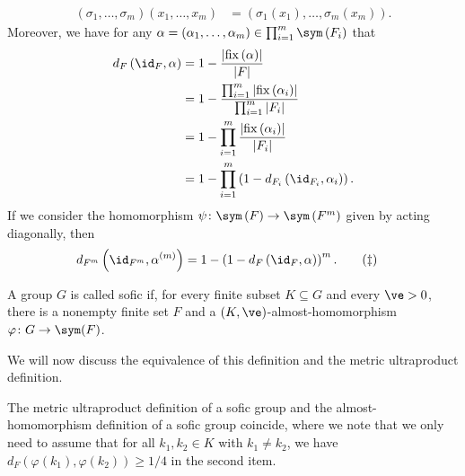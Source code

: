 \documentclass[10pt]{mypackage}
\begin{document}
\begin{align*}
  \left( \sigma_1,\dots,\sigma_m \right)\left( x_1,\dots,x_m \right) &= \left( \sigma_1\left(x_1\right),\dots,\sigma_m\left( x_m \right) \right).
\end{align*}
Moreover, we have for any $\alpha = \left( \alpha_1,\dots,\alpha_m \right)\in \prod_{i=1}^{m}\sym\left( F_i \right)$ that
\begin{align*}
  d_F\left( \id_F, \alpha \right) &= 1-\frac{\left\vert \operatorname{fix}\left( \alpha \right) \right\vert}{\left\vert F \right\vert}\\
                                  &= 1-\frac{\prod_{i=1}^{m}\left\vert \operatorname{fix}\left( \alpha_i \right) \right\vert}{\prod_{i=1}^{m}\left\vert F_i \right\vert}\\
                                  &= 1-\prod_{i=1}^{m} \frac{\left\vert \operatorname{fix}\left( \alpha_i \right) \right\vert}{\left\vert F_i \right\vert}\\
                                  &= 1-\prod_{i=1}^{m}\left( 1-d_{F_i}\left( \id_{F_i},\alpha_i \right) \right).
\end{align*}
If we consider the homomorphism $\psi\colon \sym\left( F \right)\to \sym\left( F^m \right)$ given by acting diagonally, then
\begin{align*}
  d_{F^m}\left( \id_{F^m},\alpha^{(m)} \right) &= 1-\left( 1-d_F\left( \id_{F},\alpha \right) \right)^{m}.\label{eq:diagonal_amplification}\tag{$\ddag$}
\end{align*}
\begin{definition}
  A group $G$ is called sofic if, for every finite subset $K\subseteq G$ and every $\ve > 0$, there is a nonempty finite set $F$ and a $\left( K,\ve \right)$-almost-homomorphism $\varphi\colon G\rightarrow \sym(F)$.
\end{definition}
We will now discuss the equivalence of this definition and the metric ultraproduct definition.
\begin{theorem}
  The metric ultraproduct definition of a sofic group and the almost-homomorphism definition of a sofic group coincide, where we note that we only need to assume that for all $k_1,k_2\in K$ with $k_1\neq k_2$, we have $d_F\left( \varphi\left( k_1 \right),\varphi\left( k_2 \right) \right)\geq 1/4$ in the second item.
\end{theorem}
\end{document}
